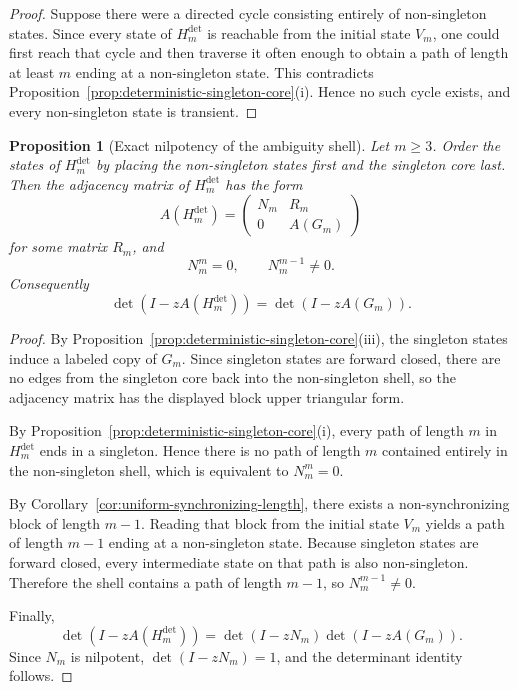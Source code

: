 \documentclass[11pt,letterpaper]{article}
\numberwithin{equation}{section}
\theoremstyle{plain}
\newtheorem{proposition}[theorem]{Proposition}
\theoremstyle{definition}
\theoremstyle{remark}
\begin{document}
\begin{proof}
Suppose there were a directed cycle consisting entirely of non-singleton states.
Since every state of $H_m^{\mathrm{det}}$ is reachable from the initial state
$V_m$, one could first reach that cycle and then traverse it often enough to
obtain a path of length at least $m$ ending at a non-singleton state.  This
contradicts Proposition~\ref{prop:deterministic-singleton-core}\textup{(i)}.
Hence no such cycle exists, and every non-singleton state is transient.
\end{proof}

\begin{proposition}[Exact nilpotency of the ambiguity shell]
\label{prop:ambiguity-shell-nilpotency}
Let $m\ge 3$.  Order the states of $H_m^{\mathrm{det}}$ by placing the
non-singleton states first and the singleton core last.  Then the adjacency
matrix of $H_m^{\mathrm{det}}$ has the form
\[
A(H_m^{\mathrm{det}})
=
\begin{pmatrix}
N_m & R_m\\
0 & A(G_m)
\end{pmatrix}
\]
for some matrix $R_m$, and
\[
N_m^m=0,
\qquad
N_m^{m-1}\neq 0.
\]
Consequently
\[
\det(I-zA(H_m^{\mathrm{det}}))=\det(I-zA(G_m)).
\]
\end{proposition}

\begin{proof}
By Proposition~\ref{prop:deterministic-singleton-core}\textup{(iii)}, the
singleton states induce a labeled copy of $G_m$.  Since singleton states are
forward closed, there are no edges from the singleton core back into the
non-singleton shell, so the adjacency matrix has the displayed block upper
triangular form.

By Proposition~\ref{prop:deterministic-singleton-core}\textup{(i)}, every path
of length $m$ in $H_m^{\mathrm{det}}$ ends in a singleton.  Hence there is no
path of length $m$ contained entirely in the non-singleton shell, which is
equivalent to $N_m^m=0$.

By Corollary~\ref{cor:uniform-synchronizing-length}, there exists a
non-synchronizing block of length $m-1$.  Reading that block from the initial
state $V_m$ yields a path of length $m-1$ ending at a non-singleton state.
Because singleton states are forward closed, every intermediate state on that
path is also non-singleton.  Therefore the shell contains a path of length
$m-1$, so $N_m^{m-1}\neq 0$.

Finally,
\[
\det(I-zA(H_m^{\mathrm{det}}))
=
\det(I-zN_m)\det(I-zA(G_m)).
\]
Since $N_m$ is nilpotent, $\det(I-zN_m)=1$, and the determinant identity
follows.
\end{proof}
\end{document}
